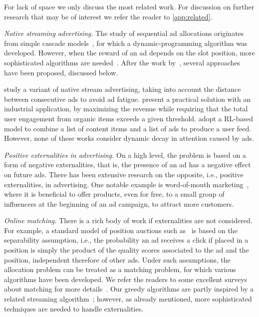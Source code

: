 
For lack of space we only discuss the most related work.
For discussion on further research that may be of interest
we refer the reader to \cref{app:related}.

\smallskip
\noindent
\emph{Native streaming advertising.}
The study of sequential ad allocations originates from simple cascade models~\citep{kempe2008cascade,aggarwal2008sponsored},
for which a dynamic-programming algorithm was developed.
However, when the reward of an ad depends on the slot position, more sophisticated algorithms are needed~\cite{ieong2014advertising}.
After the work by~\citet{ieong2014advertising}, several approaches have been proposed, discussed below.

\citet{gamzu2019advertisement} study a variant of native stream advertising, 
taking into account the distance between consecutive ads to avoid ad fatigue.
\citet{yan2020ads} present a practical solution with an industrial application, by maximizing the revenue while requiring that the total user engagement from organic items exceeds a given threshold.
\citet{liao2022cross} adopt a RL-based model to combine a list of content items and a list of ads to produce a user feed.
However, none of these works consider dynamic decay in attention caused by ads.


\smallskip
\noindent
\emph{Positive externalities in advertising.}
On a high level, the \streamads problem 
is based on a
form of negative externalities,
that is, the presence of an ad has a negative effect on future ads.
There has been extensive research on the opposite, i.e., positive externalities, in advertising.
One notable example is word-of-mouth marketing~\citep{kempe2003maximizing,hartline2008optimal},
where it is beneficial to offer products, even for free, to a small group of influencers at the beginning of an ad campaign, to attract more customers.


\smallskip
\noindent
\emph{Online matching.}
There is a rich body of work if externalities are not considered. %
For example, a standard model of position auctions such as~\citep{varian2007position} is based on the separability assumption, i.e., 
the probability an ad receives a click if placed in a position is simply the product of the quality scores associated to the ad and the position,
independent therefore of other ads.
Under such assumptions, the allocation problem can be treated as a matching problem, 
for which various algorithms have been developed. 
We refer the readers to some excellent surveys about matching for more details~\cite{mehta2007adwords,devanur2022online,huang2024online}.
Our greedy algorithms are partly inspired by a related streaming algorithm~\citep{feldman2009online};
however, as already mentioned, more sophisticated techniques are needed to handle externalities.

